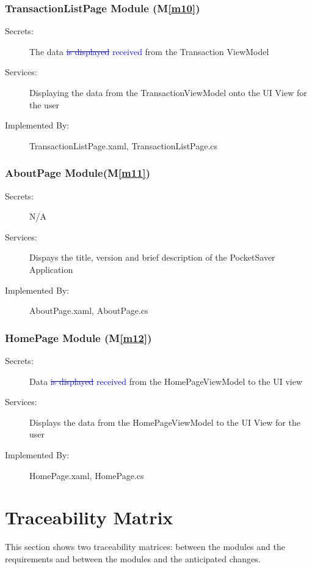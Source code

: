 \documentclass[12pt, titlepage]{article}
\newcommand{\mref}[1]{M\ref{#1}}
\begin{document}
\subsubsection{TransactionListPage Module (\mref{m10})} 
\begin{description} 
\item[Secrets:] The data \textcolor{blue}{\st{is displayed}} \textcolor{blue}{received} from the Transaction ViewModel 
\item[Services:] Displaying the data from the TransactionViewModel onto the UI View for the user
\item[Implemented By:] TransactionListPage.xaml, TransactionListPage.cs 
\end{description}

\subsubsection{AboutPage Module(\mref{m11})}
\begin{description} 
\item[Secrets:] N/A 
\item[Services:] Dispays the title, version and brief description of the PocketSaver Application 
\item[Implemented By:] AboutPage.xaml, AboutPage.cs 
\end{description}

\subsubsection{HomePage Module (\mref{m12})} 
\begin{description}
\item[Secrets:] Data \textcolor{blue}{\st{is displayed}} \textcolor{blue}{received} from the HomePageViewModel to the UI view
\item[Services:] Displays the data from the HomePageViewModel to the UI View for the user
\item[Implemented By:] HomePage.xaml, HomePage.cs 
\end{description}

\section{Traceability Matrix} \label{SecTM}

This section shows two traceability matrices: between the modules and the
requirements and between the modules and the anticipated changes.
\end{document}
